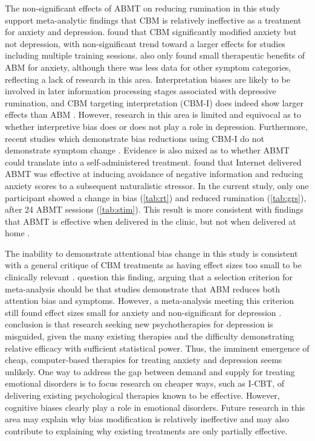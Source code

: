 \documentclass[man,floatsintext,a4paper,biblatex]{apa6}\usepackage[]{graphicx}\usepackage[]{color}
\begin{document}
The non-significant effects of ABMT on reducing rumination
in this study support meta-analytic findings that CBM
is relatively ineffective as a treatment for anxiety and
depression. \textcite{hallion_metaanalysis_2011} found that CBM
significantly modified anxiety but not depression, with non-significant
trend toward a larger effects for studies including multiple training
sessions. \textcite{mogoase_clinical_2014} also only found small
therapeutic benefits of ABM for anxiety, although there was less
data for other symptom categories, reflecting a lack of research in
this area. Interpretation biases are likely to be involved in later
information processing stages associated with depressive rumination,
and CBM targeting interpretation (CBM-I) does indeed show larger
effects than ABM \parencite{hallion_metaanalysis_2011}. However,
research in this area is limited and equivocal as to whether
interpretive bias does \parencite{mogg_interpretation_2006} or does not
\parencite{bisson_effect_2007} play a role in depression. Furthermore,
recent studies which demonstrate bias reductions using CBM-I do not
demonstrate symptom change \parencite{micco_efficacy_2014}. Evidence is
also mixed as to whether ABMT could translate into a self-administered
treatment. \textcite{see_reduction_2009} found that Internet delivered
ABMT was effective at inducing avoidance of negative information and
reducing anxiety scores to a subsequent naturalistic stressor. In
the current study, only one participant showed a change in bias
(\cref{tab:rt}) and reduced rumination (\cref{tab:grs}), after 24
ABMT sessions (\cref{tab:stim}). This result is more consistent with
findings that ABMT is effective when delivered in the clinic, but not
when delivered at home \parencite{linetzky_quantitative_2015}.

The inability to demonstrate attentional bias change in this
study is consistent with a general critique of CBM treatments
as having effect sizes too small to be clinically relevant
\parencite{cristea_efficacy_2015}. \textcite{macleod_attentional_2015}
question this finding, arguing that a selection criterion for
meta-analysis should be that studies demonstrate that ABM reduces
both attention bias and symptoms. However, a meta-analysis meeting
this criterion still found effect sizes small for anxiety and
non-significant for depression \textcite{mogoase_clinical_2014}.
\textcite{cuijpers_psychotherapies_2015} conclusion is that research
seeking new psychotherapies for depression is misguided, given the many
existing therapies and the difficulty demonstrating relative efficacy
with sufficient statistical power. Thus, the imminent emergence
of cheap, computer-based therapies for treating anxiety and depression
seems unlikely. One way to address the gap between demand and supply
for treating emotional disorders is to focus research on cheaper ways,
such as I-CBT, of delivering existing psychological therapies known to
be effective. However, cognitive biases clearly play a role in emotional
disorders. Future research in this area may explain why bias modification
is relatively ineffective and may also contribute to explaining why
existing treatments are only partially effective.
\end{document}

